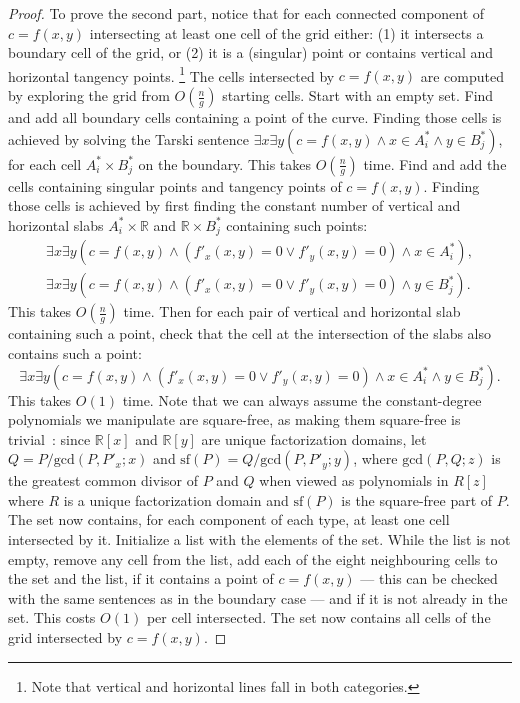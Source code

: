 \begin{proof}
    To prove the second part, notice that for each connected component of
    $c=f(x,y)$ intersecting at least one cell of the grid either: (1) it
    intersects a boundary cell of the grid, or (2) it is a (singular) point or
    contains vertical and horizontal tangency points.%
    \footnote{Note that vertical and horizontal lines fall in both categories.}
    The cells intersected by
    $c=f(x,y)$ are computed by exploring the grid from $O(\frac ng)$ starting cells.
    Start with an empty set. Find and add all boundary cells containing a point of the
    curve. Finding those cells is achieved by solving
    the Tarski sentence
    $\exists x \exists y (
    c=f(x,y)
    \land
    x \in A_i^*
    \land
    y \in B_j^*
    )$,
    for each cell $A_i^* \times B_j^*$ on the boundary.
    This takes $O(\frac ng)$ time.
    Find and add the cells containing singular points and tangency points of
    $c=f(x,y)$. Finding those cells is achieved by first finding
    the constant number of vertical and horizontal slabs $A_i^* \times
    \mathbb{R}$ and $\mathbb{R} \times B_j^*$ containing such points:
    \begin{align*}
        \exists x \exists y (
	c=f(x,y)
	\land
	( f'_x(x,y)=0 \lor f'_y(x,y)=0 )
	\land
	x \in A_i^*), \\
        \exists x \exists y (
	c=f(x,y)
	\land
	( f'_x(x,y)=0 \lor f'_y(x,y)=0 )
	\land
	y \in B_j^*).
    \end{align*}
    This takes $O(\frac ng)$ time.
    Then for each pair of vertical and horizontal slab containing such a point,
    check that the cell at the intersection of the slabs also contains such a
    point:
    \begin{displaymath}
        \exists x \exists y (
	c=f(x,y)
	\land
	( f'_x(x,y)=0 \lor f'_y(x,y)=0 )
	\land
	x \in A_i^*
	\land
	y \in B_j^*
	).
    \end{displaymath}
    This takes $O(1)$ time.
%
Note that we can always assume the constant-degree polynomials we manipulate
are square-free, as making them square-free is trivial~\cite{Y76}: since
$\mathbb{R}[x]$ and $\mathbb{R}[y]$ are unique factorization domains, let $Q =
P/\text{gcd}(P,P'_x;x)$ and $\text{sf}(P) = Q/\text{gcd}(P,P'_y;y)$, where
$\text{gcd}(P,Q;z)$ is the greatest common divisor of $P$ and $Q$ when viewed
as polynomials in $R[z]$ where $R$ is a unique factorization domain and
$\text{sf}(P)$
is the square-free part of $P$.
%
    The set now contains, for each component of each
    type, at least one cell intersected by it. Initialize a list with the
    elements of the set. While the list is not empty, remove any cell from the
    list, add each of the eight neighbouring cells to the set and the list,
    if it contains a point of $c=f(x,y)$ --- this can be checked with the same
    sentences as in the boundary case --- and if
    it is not already in the set. This costs $O(1)$ per cell intersected.
    The set now contains all cells of the grid intersected by $c=f(x,y)$.
\end{proof}

